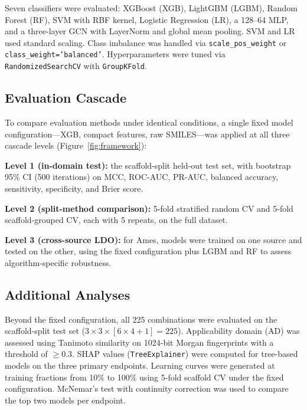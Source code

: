 \documentclass[journal=jacsat,manuscript=article]{achemso}
\begin{document}
Seven classifiers were evaluated: XGBoost (XGB),\cite{Chen_XGBoost_2016} LightGBM 
(LGBM),\cite{Ke_LightGBM_2017} Random Forest (RF),\cite{Breiman_2001} SVM with RBF 
kernel,\cite{Cortes_Vapnik_1995} Logistic Regression (LR),\cite{Cox_1958} a 128--64 
MLP,\cite{Rumelhart_1986} and a three-layer GCN\cite{Kipf_Welling_2017} with LayerNorm and 
global mean pooling. SVM and LR used standard scaling. Class imbalance was handled via 
\texttt{scale\_pos\_weight} or \texttt{class\_weight='balanced'}. Hyperparameters were tuned 
via \texttt{RandomizedSearchCV} with \texttt{GroupKFold}\cite{Pedregosa_sklearn_2011}.

\subsection{Evaluation Cascade}

To compare evaluation methods under identical conditions, a single fixed model 
configuration---XGB, compact features, raw SMILES---was applied at all three cascade 
levels (Figure~\ref{fig:framework}):

\textbf{Level 1 (in-domain test):} the scaffold-split held-out test set, with bootstrap 
95\% CI (500 iterations) on MCC,\cite{Matthews_1975} ROC-AUC, PR-AUC, balanced accuracy, 
sensitivity, specificity, and Brier score.\cite{Brier_1950}

\textbf{Level 2 (split-method comparison):} 5-fold stratified random CV and 5-fold 
scaffold-grouped CV, each with 5 repeats, on the full dataset.

\textbf{Level 3 (cross-source LDO):} for Ames, models were trained on one source and 
tested on the other, using the fixed configuration plus LGBM and RF to assess 
algorithm-specific robustness.

\subsection{Additional Analyses}

Beyond the fixed configuration, all 225 combinations were evaluated on the scaffold-split 
test set ($3 \times 3 \times [6 \times 4 + 1] = 225$). Applicability domain (AD) was 
assessed using Tanimoto similarity on 1024-bit Morgan 
fingerprints\cite{Rogers_Hahn_2010} with a threshold of $\geq 0.3$. SHAP 
values\cite{Lundberg_SHAP_2017} (\texttt{TreeExplainer}) were computed for tree-based 
models on the three primary endpoints. Learning curves were generated at training fractions 
from 10\% to 100\% using 5-fold scaffold CV under the fixed configuration. McNemar's 
test\cite{McNemar_1947} with continuity correction was used to compare the top two models 
per endpoint.
\end{document}
